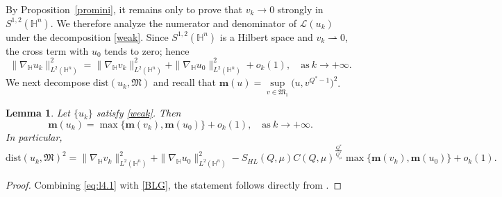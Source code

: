 \documentclass[10pt,a4paper]{amsart}
\newtheorem{lemma}{Lemma}[section]
\begin{document}
{By Proposition~\ref{promini}, it remains only to prove that $v_k\to0$ strongly in $S^{1,2}(\mathbb{H}^{n})$. We therefore analyze the numerator and denominator of $\mathcal{L}(u_k)$ under the decomposition \eqref{weak}.}
{Since $S^{1,2}(\mathbb H^n)$ is a Hilbert space and $v_k\rightharpoonup0$, the cross term with $u_0$ tends to zero; hence}
\begin{equation}\label{BLG}
 \|\nabla_\mathbb{H} u_k\|_{L^2(\mathbb{H}^n)}^2=\|\nabla_\mathbb{H} v_k\|_{L^2(\mathbb{H}^n)}^2+\|\nabla_\mathbb{H} u_0\|_{L^2(\mathbb{H}^n)}^2+o_k(1),\quad \mathrm{as} ~k\rightarrow+\infty.
\end{equation}
{We next decompose $\mathrm{dist}(u_k,\mathfrak M)$ and recall that} $\mathbf{m}(u)=\sup\limits_{v\in \mathfrak{M}_1}\big(u,v^{Q^{\ast}-1}\big)^2$.

\begin{lemma}\label{l5.1}
{Let $\{u_k\}$ satisfy \eqref{weak}. Then}
\begin{equation*}
 \mathbf{m}(u_k)=\max\big\{\mathbf{m}(v_k),\mathbf{m}(u_0)\big\}+o_k(1),\quad \mathrm{as} ~k\rightarrow+\infty.
\end{equation*}
In particular,
\begin{equation*}
 \mathrm{dist}(u_k,\mathfrak{M})^2=\|\nabla_\mathbb{H} v_k\|_{L^2(\mathbb{H}^n)}^2+\|\nabla_\mathbb{H} u_0\|_{L^2(\mathbb{H}^n)}^2-S_{HL}(Q,\mu)C(Q,\mu)^{\frac{Q^{\ast}}{Q^{\ast}_{\mu}}}\max\big
 \{\mathbf{m}(v_k),\mathbf{m}(u_0)\big\}+o_k(1).
\end{equation*}
\end{lemma}
\begin{proof}
{Combining \eqref{eq:l4.1} with \eqref{BLG}, the statement follows directly from} \cite[Lemma 4.2]{K25}.
\end{proof}
\end{document}
